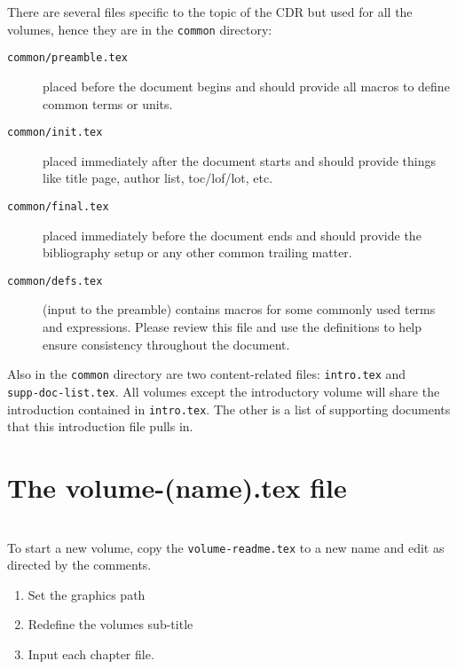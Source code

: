 There are several files specific to the topic of the CDR but used for all the volumes, hence 
they are in the \texttt{common} directory:

\begin{description}
\item[\texttt{common/preamble.tex}] placed before the document begins and should provide all macros to define common terms or units.
\item[\texttt{common/init.tex}] placed immediately after the document starts and should provide things like title page, author list, toc/lof/lot, etc.
\item[\texttt{common/final.tex}] placed immediately before the document ends and should provide the bibliography setup or any other common trailing matter.
\item[\texttt{common/defs.tex}] (input to the preamble) contains macros for some commonly 
used terms and expressions. Please review this file and use the definitions to help ensure consistency
throughout the document.
\end{description}

Also in the \texttt{common} directory are two content-related files: \texttt{intro.tex} and \\
\texttt{supp-doc-list.tex}.  All volumes except the introductory volume will share the introduction
contained in \texttt{intro.tex}.  The other is a list of supporting documents that this
introduction file pulls in.

\section{The volume-(name).tex file}

 \\

To start a new volume, copy the \texttt{volume-readme.tex} to a new
name and edit as directed by the comments.  

\begin{enumerate}
\item Set the graphics path
\item Redefine the volumes sub-title
\item Input each chapter file.
\end{enumerate}

